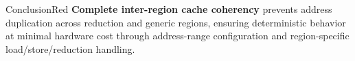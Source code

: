 \begin{highlight}{Conclusion}{Red}
    \textbf{Complete inter-region cache coherency} prevents address duplication across \gls{reduction} and generic regions, ensuring deterministic behavior at minimal hardware cost through address-range configuration and region-specific load/store/reduction handling.
\end{highlight}